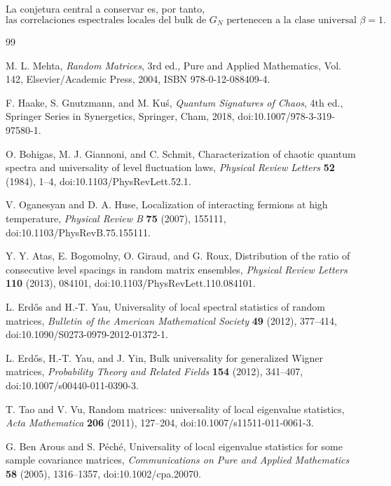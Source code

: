 \documentclass[11pt,a4paper]{article}
\begin{document}
La conjetura central a conservar es, por tanto,
\begin{equation}
\boxed{
\text{las correlaciones espectrales locales del bulk de }G_N
\text{ pertenecen a la clase universal }\beta=1.
}
\end{equation}

\begin{thebibliography}{99}

M. L. Mehta,
\emph{Random Matrices}, 3rd ed.,
Pure and Applied Mathematics, Vol. 142,
Elsevier/Academic Press, 2004,
ISBN 978-0-12-088409-4.

F. Haake, S. Gnutzmann, and M. Kuś,
\emph{Quantum Signatures of Chaos}, 4th ed.,
Springer Series in Synergetics,
Springer, Cham, 2018,
doi:10.1007/978-3-319-97580-1.

O. Bohigas, M. J. Giannoni, and C. Schmit,
Characterization of chaotic quantum spectra and universality of level fluctuation laws,
\emph{Physical Review Letters} \textbf{52} (1984), 1--4,
doi:10.1103/PhysRevLett.52.1.

V. Oganesyan and D. A. Huse,
Localization of interacting fermions at high temperature,
\emph{Physical Review B} \textbf{75} (2007), 155111,
doi:10.1103/PhysRevB.75.155111.

Y. Y. Atas, E. Bogomolny, O. Giraud, and G. Roux,
Distribution of the ratio of consecutive level spacings in random matrix ensembles,
\emph{Physical Review Letters} \textbf{110} (2013), 084101,
doi:10.1103/PhysRevLett.110.084101.

L. Erdős and H.-T. Yau,
Universality of local spectral statistics of random matrices,
\emph{Bulletin of the American Mathematical Society} \textbf{49} (2012), 377--414,
doi:10.1090/S0273-0979-2012-01372-1.

L. Erdős, H.-T. Yau, and J. Yin,
Bulk universality for generalized Wigner matrices,
\emph{Probability Theory and Related Fields} \textbf{154} (2012), 341--407,
doi:10.1007/s00440-011-0390-3.

T. Tao and V. Vu,
Random matrices: universality of local eigenvalue statistics,
\emph{Acta Mathematica} \textbf{206} (2011), 127--204,
doi:10.1007/s11511-011-0061-3.

G. Ben Arous and S. Péché,
Universality of local eigenvalue statistics for some sample covariance matrices,
\emph{Communications on Pure and Applied Mathematics} \textbf{58} (2005), 1316--1357,
doi:10.1002/cpa.20070.


\end{thebibliography}
\end{document}
